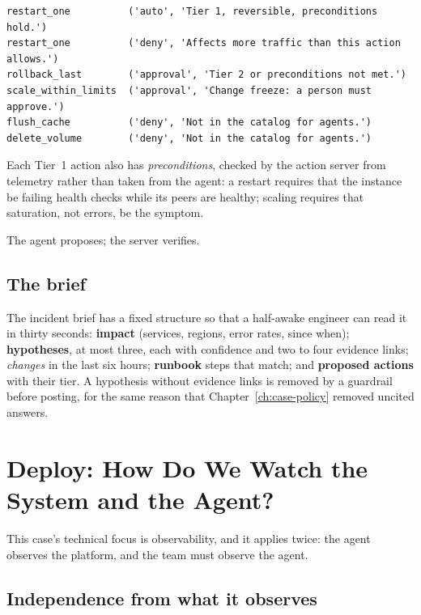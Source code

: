 \begin{lstlisting}[language={}, numbers=none, frame=none, xleftmargin=1.5em]
restart_one          ('auto', 'Tier 1, reversible, preconditions hold.')
restart_one          ('deny', 'Affects more traffic than this action allows.')
rollback_last        ('approval', 'Tier 2 or preconditions not met.')
scale_within_limits  ('approval', 'Change freeze: a person must approve.')
flush_cache          ('deny', 'Not in the catalog for agents.')
delete_volume        ('deny', 'Not in the catalog for agents.')
\end{lstlisting}

Each Tier~1 action also has \emph{preconditions}, checked by the action server from telemetry rather than taken from the agent: a restart requires that the instance be failing health checks while its peers are healthy; scaling requires that saturation, not errors, be the symptom. \begin{keyidea}
The agent proposes; the server verifies.
\end{keyidea}

\subsection{The brief}

The incident brief has a fixed structure so that a half-awake engineer can read it in thirty seconds: \textbf{impact} (services, regions, error rates, since when); \textbf{hypotheses}, at most three, each with confidence and two to four evidence links; \emph{changes} in the last six hours; \textbf{runbook} steps that match; and \textbf{proposed actions} with their tier. A hypothesis without evidence links is removed by a guardrail before posting, for the same reason that Chapter~\ref{ch:case-policy} removed uncited answers.

\section{Deploy: How Do We Watch the System and the Agent?}
\label{sec:inc-deploy}

This case's technical focus is observability, and it applies twice: the agent observes the platform, and the team must observe the agent.

\subsection{Independence from what it observes}


